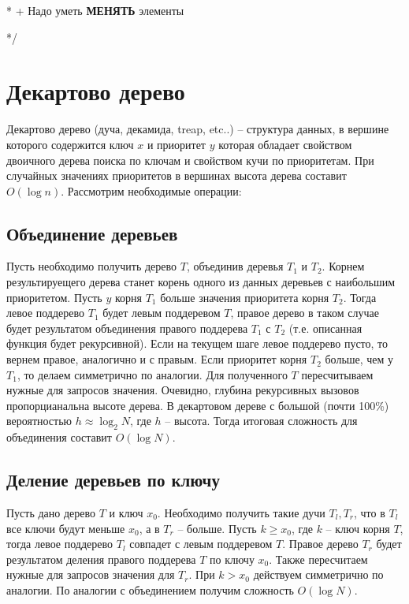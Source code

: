   * + Надо уметь \textbf{МЕНЯТЬ} элементы\
  
  */\
  
\section{Декартово дерево}
Декартово дерево (дуча, декамида, treap, etc..) -- структура данных, в вершине которого содержится ключ $x$ и приоритет $y$ которая обладает свойством двоичного дерева поиска по ключам и свойством кучи по приоритетам. При случайных значениях приоритетов в вершинах высота дерева составит $O(\log{n})$. \newline
Рассмотрим необходимые операции:\newline

\subsection*{Объединение деревьев}
Пусть необходимо получить дерево $T$, объединив деревья $T_1$ и $T_2$. Корнем результируещего дерева станет корень одного из данных деревьев с наибольшим приоритетом. Пусть $y$ корня $T_1$ больше значения приоритета корня $T_2$. Тогда левое поддерево $T_1$ будет левым поддеревом $T$, правое дерево в таком случае будет результатом объединения правого поддерева $T_1$ с $T_2$ (т.е. описанная функция будет рекурсивной). Если на текущем шаге левое поддерево пусто, то вернем правое, аналогично и с правым. Если приоритет корня $T_2$ больше, чем у $T_1$, то делаем симметрично по аналогии. Для полученного $T$ пересчитываем нужные для запросов значения. Очевидно, глубина рекурсивных вызовов пропорцианальна высоте дерева. В декартовом дереве с большой (почти 100\%) вероятностью $h\approx\log_2{N}$, где $h$ -- высота. Тогда итоговая сложность для объединения составит $O(\log{N})$.

\subsection*{Деление деревьев по ключу}
Пусть дано дерево $T$ и ключ $x_0$. Необходимо получить такие дучи $T_l, T_r$, что в $T_l$ все ключи будут меньше $x_0$, а в $T_r$ -- больше. Пусть $k\geq x_0$, где $k$ -- ключ корня $T$, тогда левое поддерево $T_l$ совпадет с левым поддеревом $T$. Правое дерево $T_r$ будет результатом деления правого поддерева $T$ по ключу $x_0$. Также пересчитаем нужные для запросов значения для $T_r$. При $k>x_0$ действуем симметрично по аналогии. По аналогии с объединением получим сложность $O(\log{N})$.

